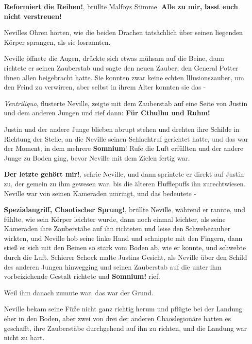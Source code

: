 \glqq{}\textbf{Reformiert die Reihen!}\grqq{}, brüllte Malfoys Stimme. \glqq{}
\textbf{Alle zu mir, lasst euch nicht verstreuen!}\grqq{}

Nevilles Ohren hörten, wie die beiden Drachen tatsächlich über seinen liegenden
Körper sprangen, als sie losrannten.

Neville öffnete die Augen, drückte sich etwas mühsam auf die Beine, dann
richtete er seinen Zauberstab und sagte den neuen Zauber, den General Potter
ihnen allen beigebracht hatte. Sie konnten zwar keine echten Illusionszauber, um
den Feind zu verwirren, aber selbst in ihrem Alter konnten sie das -

\glqq{}\emph{Ventriliquo}\grqq{}, flüsterte Neville, zeigte mit dem Zauberstab
auf eine Seite von Justin und dem anderen Jungen und rief dann:
\glqq{}\textbf{Für Cthulhu und Ruhm!}\grqq{}

Justin und der andere Junge blieben abrupt stehen und drehten ihre Schilde in
Richtung der Stelle, an die Neville seinen Schlachtruf gerichtet hatte, und das
war der Moment, in dem mehrere \glqq{}\textbf{Somnium}!\grqq{} Rufe die Luft
erfüllten und der andere Junge zu Boden ging, bevor Neville mit dem Zielen
fertig war.

\glqq{}\textbf{Der letzte gehört mir!}\grqq{}, schrie Neville, und dann
sprintete er direkt auf Justin zu, der gemein zu ihm gewesen war, bis die
älteren Hufflepuffs ihn zurechtwiesen. Neville war von seinen Kameraden umringt,
und das bedeutete -

\glqq{}\textbf{Spezialangriff, Chaotischer Sprung!}\grqq{}, brüllte Neville,
während er rannte, und fühlte, wie sein Körper leichter wurde, dann noch einmal
leichter, als seine Kameraden ihre Zauberstäbe auf ihn richteten und leise den
Schwebezauber wirkten, und Neville hob seine linke Hand und schnippte mit den
Fingern, dann stieß er sich mit den Beinen so stark vom Boden ab, wie er konnte,
und schwebte durch die Luft. Schierer Schock malte Justins Gesicht, als Neville
über den Schild des anderen Jungen hinwegging und seinen Zauberstab auf die
unter ihm vorbeiziehende Gestalt richtete und \glqq{}\textbf{Somnium!\grqq{}}
rief.

Weil ihm danach zumute war, das war der Grund.

Neville bekam seine Füße nicht ganz richtig herum und pflügte bei der Landung
eher in den Boden, aber zwei von drei der anderen Chaoslegionäre hatten es
geschafft, ihre Zauberstäbe durchgehend auf ihn zu richten, und die Landung war
nicht zu hart.


